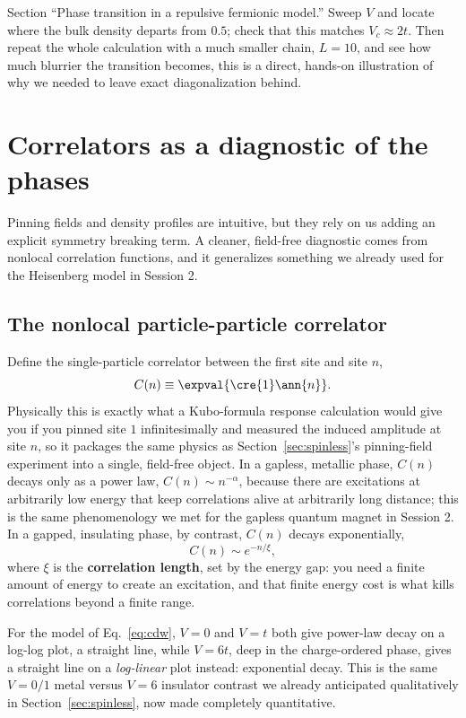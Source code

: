 \documentclass[all_sessions.tex]{subfiles}
\begin{document}
\begin{notebook}
Section ``Phase transition in a repulsive fermionic model.'' Sweep $V$ and locate where the bulk
density departs from $0.5$; check that this matches $V_c\approx2t$. Then repeat the whole
calculation with a much smaller chain, $L=10$, and see how much blurrier the transition becomes,
this is a direct, hands-on illustration of why we needed to leave exact diagonalization behind.
\end{notebook}

\section{Correlators as a diagnostic of the phases}
\label{sec:correlators}
Pinning fields and density profiles are intuitive, but they rely on us adding an explicit symmetry
breaking term. A cleaner, field-free diagnostic comes from nonlocal correlation functions, and it
generalizes something we already used for the Heisenberg model in Session 2.

\subsection{The nonlocal particle-particle correlator}
Define the single-particle correlator between the first site and site $n$,
\begin{equation}
  C(n) \equiv \expval{\cre{1}\ann{n}}.
\end{equation}
Physically this is exactly what a Kubo-formula response calculation would give you if you pinned
site $1$ infinitesimally and measured the induced amplitude at site $n$, so it packages the same
physics as Section~\ref{sec:spinless}'s pinning-field experiment into a single, field-free object.
In a gapless, metallic phase, $C(n)$ decays only as a power law, $C(n)\sim n^{-\alpha}$, because
there are excitations at arbitrarily low energy that keep correlations alive at arbitrarily long
distance; this is the same phenomenology we met for the gapless quantum magnet in Session 2. In a
gapped, insulating phase, by contrast, $C(n)$ decays exponentially,
\begin{equation}
  C(n) \sim e^{-n/\xi},
\end{equation}
where $\xi$ is the \textbf{correlation length}, set by the energy gap: you need a finite amount of
energy to create an excitation, and that finite energy cost is what kills correlations beyond a
finite range.

For the model of Eq.~\eqref{eq:cdw}, $V=0$ and $V=t$ both give power-law decay on a log-log plot, a
straight line, while $V=6t$, deep in the charge-ordered phase, gives a straight line on a
\emph{log-linear} plot instead: exponential decay. This is the same $V=0/1$ metal versus $V=6$
insulator contrast we already anticipated qualitatively in Section~\ref{sec:spinless}, now made
completely quantitative.
\end{document}
